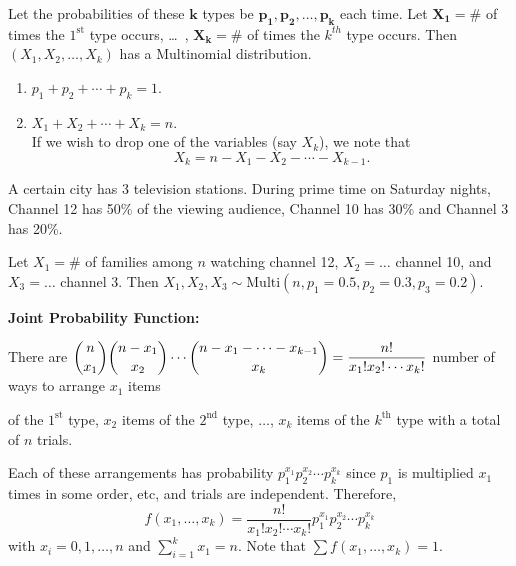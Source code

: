Let the probabilities of these $\mathbf{k}$ types be $\mathbf{p_1,p_2,\ldots,p_k}$ each time. Let $\mathbf{X_1} = \#$ of times the $1^{\text{st}}$ type occurs, \dots \, , $\mathbf{X_k} = \#$ of times the $k^{th}$ type occurs. Then $\left( X_1,X_2,\ldots,X_k \right)$ has a Multinomial distribution.

\begin{note}
    \phantom{}
    \begin{enumerate}
        \item $p_1 + p_2 + \cdots + p_k = 1$.
        \item $X_1 + X_2 + \cdots + X_k = n$. \\
        If we wish to drop one of the variables (say $X_k$), we note that \vspace{-3mm}
        \[
            X_k = n - X_1 - X_2 - \cdots - X_{k-1}.
        \]
    \end{enumerate}
\end{note}

\begin{example}
    A certain city has 3 television stations. During prime time on Saturday nights, Channel 12 has 50\% of the viewing audience, Channel 10 has 30\% and Channel 3 has 20\%.

    Let $X_1 = \#$ of families among $n$ watching channel 12, $X_2 = \ldots$ channel 10, and $X_3 = \ldots$ channel 3. Then $X_1,X_2,X_3 \sim \text{Multi}(n,p_1 = 0.5,p_2 = 0.3,p_3 = 0.2)$. \\
\end{example}

\textbf{Joint Probability Function:}

There are $\displaystyle \binom{n}{x_1} \binom{n-x_1}{x_2} \cdots \binom{n-x_1 - \cdots - x_{k-1}}{x_k} = \frac{n!}{x_1! x_2! \cdots x_k!}$ number of ways to arrange $x_1$ items

of the $1^{\text{st}}$ type, $x_2$ items of the $2^{\text{nd}}$ type, $\ldots$, $x_k$ items of the $k^{\text{th}}$ type with a total of $n$ trials.

Each of these arrangements has probability $p_1^{x_1}p_2^{x_2} \cdots p_k^{x_k}$ since $p_1$ is multiplied $x_1$ times in some order, etc, and trials are independent. Therefore,
\[
    f(x_1,\ldots ,x_k) = \frac{n!}{x_1! x_2! \cdots x_k!} p_1^{x_1}p_2^{x_2} \cdots p_k^{x_k}
\]
with $x_i = 0,1,\ldots ,n$ and $\displaystyle \sum_{i=1}^{k} x_1 = n$.
Note that $\displaystyle \sum f(x_1,\ldots ,x_k) = 1$.

\pagebreak

